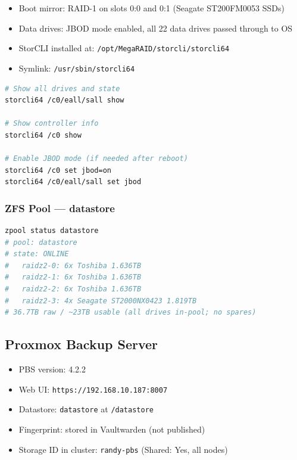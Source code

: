 \documentclass[11pt,letterpaper]{article}
\begin{document}
\begin{itemize}
  \item Boot mirror: RAID-1 on slots 0:0 and 0:1 (Seagate ST200FM0053 SSDs)
  \item Data drives: JBOD mode enabled, all 22 data drives passed through to OS
  \item StorCLI installed at: \texttt{/opt/MegaRAID/storcli/storcli64}
  \item Symlink: \texttt{/usr/sbin/storcli64}
\end{itemize}

\begin{lstlisting}[language=bash, caption={Useful StorCLI commands}]
# Show all drives and state
storcli64 /c0/eall/sall show

# Show controller info
storcli64 /c0 show

# Enable JBOD mode (if needed after reboot)
storcli64 /c0 set jbod=on
storcli64 /c0/eall/sall set jbod
\end{lstlisting}

\subsubsection{ZFS Pool — datastore}

\begin{lstlisting}[language=bash, caption={ZFS pool layout}]
zpool status datastore
# pool: datastore
# state: ONLINE
#   raidz2-0: 6x Toshiba 1.636TB
#   raidz2-1: 6x Toshiba 1.636TB
#   raidz2-2: 6x Toshiba 1.636TB
#   raidz2-3: 4x Seagate ST2000NX0423 1.819TB
# 36.7TB raw / ~23TB usable (all drives in-pool; no spares)
\end{lstlisting}

\subsection{Proxmox Backup Server}

\begin{itemize}
  \item PBS version: 4.2.2
  \item Web UI: \texttt{https://192.168.10.187:8007}
  \item Datastore: \texttt{datastore} at \texttt{/datastore}
  \item Fingerprint: stored in Vaultwarden (not published)
  \item Storage ID in cluster: \texttt{randy-pbs} (Shared: Yes, all nodes)
\end{itemize}
\end{document}
